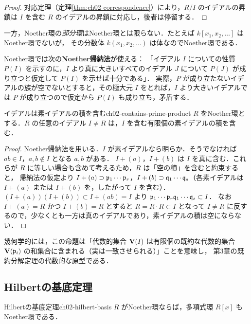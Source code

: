 \begin{proof}
対応定理（定理\ref{thm:ch02-correspondence}）により，$R/I$ のイデアルの昇鎖は $I$ を含む $R$ のイデアルの昇鎖に対応し，後者は停留する．
\end{proof}

一方，Noether環の\emph{部分環}はNoether環とは限らない．たとえば $k[x_1,x_2,\dots]$ はNoether環でないが，
その分数体 $k(x_1,x_2,\dots)$ は体なのでNoether環である．

Noether環では次の\textbf{Noether帰納法}が使える：
「イデアル $I$ についての性質 $P(I)$ を示すのに，$I$ より真に大きいすべてのイデアル $J$ について $P(J)$ が成り立つと仮定して $P(I)$ を示せば十分である」．
実際，$P$ が成り立たないイデアルの族が空でないとすると，その極大元 $I$ をとれば，$I$ より大きいイデアルでは $P$ が成り立つので仮定から $P(I)$ も成り立ち，矛盾する．

\begin{myprop}{イデアルは素イデアルの積を含む}{ch02-contains-prime-product}
$R$ をNoether環とする．$R$ の任意のイデアル $I\ne R$ は，$I$ を含む有限個の素イデアルの積を含む．
\end{myprop}

\begin{proof}
Noether帰納法を用いる．$I$ が素イデアルなら明らか．そうでなければ $ab\in I$，$a,b\notin I$ となる $a,b$ がある．
$I+(a)$，$I+(b)$ は $I$ を真に含む．これらが $R$ に等しい場合も含めて考えるため，$R$ は「空の積」を含むと約束すると，
帰納法の仮定より $I+(a)\supset\mathfrak{p}_1\cdots\mathfrak{p}_r$，$I+(b)\supset\mathfrak{q}_1\cdots\mathfrak{q}_s$（各素イデアルは $I+(a)$ または $I+(b)$ を，したがって $I$ を含む）．
$(I+(a))(I+(b))\subset I+(ab)=I$ より $\mathfrak{p}_1\cdots\mathfrak{p}_r\mathfrak{q}_1\cdots\mathfrak{q}_s\subset I$．
なお $I+(a)=R$ かつ $I+(b)=R$ とすると $R=R\cdot R\subset I$ となって $I\ne R$ に反するので，少なくとも一方は真のイデアルであり，素イデアルの積は空にならない．
\end{proof}

幾何学的には，この命題は「代数的集合 $\mathbf{V}(I)$ は有限個の既約な代数的集合 $\mathbf{V}(\mathfrak{p}_i)$ の和集合に含まれる（実は一致させられる）」ことを意味し，
第3章の既約分解定理の代数的な原型である．

\subsection{Hilbertの基底定理}

\begin{mythm}{Hilbertの基底定理}{ch02-hilbert-basis}
$R$ がNoether環ならば，多項式環 $R[x]$ もNoether環である．
\end{mythm}

